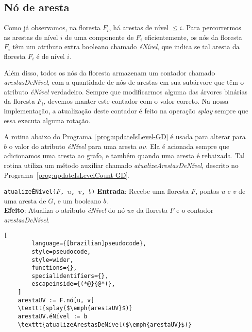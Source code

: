 \subsection{Nó de aresta}
\label{sec:node-edge}

Como já observamos, na floresta $F_i$, há arestas de nível $\leq i$. Para percorrermos as arestas de nível $i$ de uma componente de $F_i$ eficientemente, os nós da floresta $F_i$ têm um atributo extra booleano chamado \textit{éNível}, que indica se tal aresta da floresta $F_i$ é de nível $i$. 

Além disso, todos os nós da floresta armazenam um contador chamado \textit{arestasDeNível}, com a quantidade de nós de arestas em sua subárvore que têm o atributo \textit{éNível} verdadeiro. Sempre que modificarmos alguma das árvores binárias da floresta $F_i$, devemos manter este contador com o valor correto. Na nossa implementação, a atualização deste contador é feito na operação \textit{splay} sempre que essa executa alguma rotação.

A rotina abaixo do Programa~\ref{prog:updateIsLevel-GD} é usada para alterar para $b$ o valor do atributo \textit{éNível} para uma aresta $uv$. Ela é acionada sempre que adicionamos uma aresta ao grafo, e também quando uma aresta é rebaixada. Tal rotina utiliza um método auxiliar chamado \textit{atualizeArestasDeNível}, descrito no Programa~\ref{prog:updateIsLevelCount-GD}.

\begin{programruledcaption}{\texttt{atualizeÉNível($F$, $u$, $v$, $b$)} \label{prog:updateIsLevel-GD}}
    \noindent\textbf{Entrada}: Recebe uma floresta $F$, pontas $u$ e $v$ de uma aresta de $G$, e um booleano $b$.\\
    \noindent\textbf{Efeito}: Atualiza o atributo \textit{éNível} do nó $uv$ da floresta $F$ e o contador \textit{arestasDeNível}.
    \vspace{-0.5\baselineskip}
    \begin{lstlisting}[
        language={[brazilian]pseudocode},
        style=pseudocode,
        style=wider,
        functions={},
        specialidentifiers={},
        escapeinside={(*@}{@*)},
    ]
    arestaUV := F.nó[u, v] 
    \texttt{splay($\emph{arestaUV}$)}
    arestaUV.éNível := b
    \texttt{atualizeArestasDeNível($\emph{arestaUV}$)}
\end{lstlisting}
\vspace{-0.5\baselineskip}
\end{programruledcaption}

